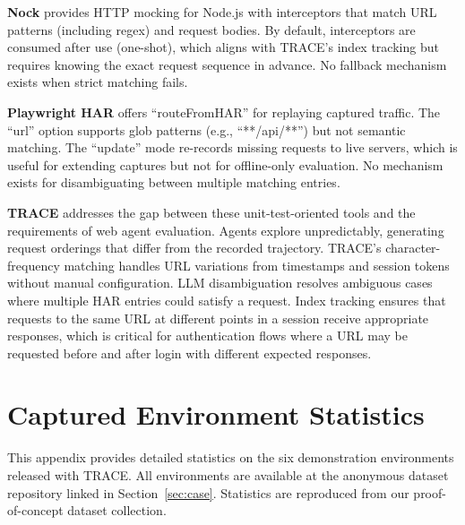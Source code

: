 \documentclass[letterpaper]{article}
\begin{document}
\textbf{Nock} \citep{nock2011} provides HTTP mocking for Node.js with interceptors that match URL patterns (including regex) and request bodies. By default, interceptors are consumed after use (one-shot), which aligns with TRACE's index tracking but requires knowing the exact request sequence in advance. No fallback mechanism exists when strict matching fails.

\textbf{Playwright HAR} \citep{playwrighthar2023} offers ``routeFromHAR'' for replaying captured traffic. The ``url'' option supports glob patterns (e.g., ``**/api/**'') but not semantic matching. The ``update'' mode re-records missing requests to live servers, which is useful for extending captures but not for offline-only evaluation. No mechanism exists for disambiguating between multiple matching entries.

\textbf{TRACE} addresses the gap between these unit-test-oriented tools and the requirements of web agent evaluation. Agents explore unpredictably, generating request orderings that differ from the recorded trajectory. TRACE's character-frequency matching handles URL variations from timestamps and session tokens without manual configuration. LLM disambiguation resolves ambiguous cases where multiple HAR entries could satisfy a request. Index tracking ensures that requests to the same URL at different points in a session receive appropriate responses, which is critical for authentication flows where a URL may be requested before and after login with different expected responses.


\section{Captured Environment Statistics}
\label{app:statistics}

This appendix provides detailed statistics on the six demonstration environments released with TRACE. All environments are available at the anonymous dataset repository linked in Section~\ref{sec:case}. Statistics are reproduced from our proof-of-concept dataset collection.
\end{document}
